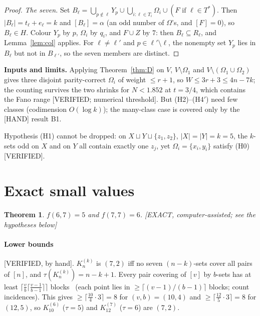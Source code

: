 \documentclass[11pt]{article}
\newtheorem{theorem}{Theorem}[section]
\theoremstyle{definition}
\newcommand{\st}[1]{\textsf{\small[#1]}}
\begin{document}
\begin{proof}
\emph{The seven.} Set $B_\ell=\bigcup_{p\notin\ell}Y_p\cup\bigcup_{i:\ell\in T_i}\Omega_i\cup(F\text{ if }\ell\in T^*)$.
Then $|B_\ell|=t_\ell+e_\ell=k$ and $[B_\ell]=\alpha$ (an odd number of $\Omega$'s, and $[F]=0$), so $B_\ell\in H$.
Colour $Y_p$ by $p$, $\Omega_i$ by $q_i$, and $F\cup Z$ by $7$: then $B_\ell\subseteq R_\ell$, and
Lemma~\ref{lem:col} applies. For $\ell\ne\ell'$ and $p\in\ell'\setminus\ell$, the nonempty set $Y_p$ lies in $B_\ell$
but not in $B_{\ell'}$, so the seven members are distinct.
\end{proof}

\noindent\textbf{Inputs and limits.} Applying Theorem~\ref{thm:D} on $V$, $V\setminus\Omega_1$ and
$V\setminus(\Omega_1\cup\Omega_2)$ gives three disjoint parity-correct $\Omega_i$ of weight $\le r+1$, so
$W\le3r+3\le4n-7k$; the counting survives the two shrinks for $N<1.852$ at $t=3/4$, which contains the Fano range
\st{VERIFIED; numerical threshold}. But (H2)--(H4$'$) need few classes (codimension $O(\log k)$); the many-class
case is covered only by the \st{HAND} result B1.

Hypothesis (H1) cannot be dropped: on $X\sqcup Y\sqcup\{z_1,z_2\}$, $|X|=|Y|=k=5$, the $k$-sets odd on $X$ and on $Y$
all contain exactly one $z_j$, yet $\Omega_i=\{x_i,y_i\}$ satisfy (H0) \st{VERIFIED}.

\section{Exact small values}\label{sec:small}

\begin{theorem}\label{thm:small}
$f(6,7)=5$ and $f(7,7)=6$. \st{EXACT, computer-assisted; see the hypotheses below}
\end{theorem}
\paragraph{Lower bounds} \st{VERIFIED, by hand}. $K^{(k)}_n$ is $(7,2)$ iff no seven $(n-k)$-sets cover all pairs of
$[n]$, and $\tau(K^{(k)}_n)=n-k+1$. Every pair covering of $[v]$ by $b$-sets has at least
$\lceil\frac vb\lceil\frac{v-1}{b-1}\rceil\rceil$ blocks~\cite{Sch} (each point lies in $\ge\lceil(v-1)/(b-1)\rceil$
blocks; count incidences). This gives $\ge\lceil\frac{10}4\cdot3\rceil=8$ for $(v,b)=(10,4)$ and
$\ge\lceil\frac{12}5\cdot3\rceil=8$ for $(12,5)$, so $K^{(6)}_{10}$ ($\tau=5$) and $K^{(7)}_{12}$ ($\tau=6$) are $(7,2)$.
\end{document}

